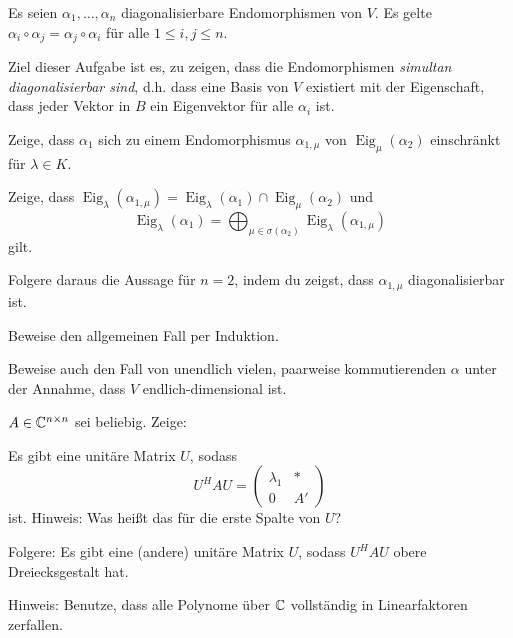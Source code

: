 \begin{sheet}

\begin{problem}[title={Simultane Diagonalisierbarkeit}]\label{ex:simultan_diagonalisieren}
Es seien $\alpha_1,\ldots,\alpha_n$ diagonalisierbare Endomorphismen von $V$. Es gelte $\alpha_i\circ\alpha_j = \alpha_j\circ\alpha_i$ für alle $1\leq i,j\leq n$.

Ziel dieser Aufgabe ist es, zu zeigen, dass die Endomorphismen \emph{simultan diagonalisierbar sind}, d.h. dass eine Basis von $V$ existiert mit der Eigenschaft, dass jeder Vektor in $B$ ein Eigenvektor für alle $\alpha_i$ ist.

\begin{subproblem}
Zeige, dass $\alpha_1$ sich zu einem Endomorphismus $\alpha_{1,\mu}$ von $\operatorname{Eig}_\mu(\alpha_2)$ einschränkt für $\lambda\in K$.
\end{subproblem}
\begin{subproblem}
Zeige, dass $\operatorname{Eig}_\lambda(\alpha_{1,\mu}) = \operatorname{Eig}_\lambda(\alpha_1) \cap \operatorname{Eig}_\mu(\alpha_2)$ und
\[\operatorname{Eig}_\lambda(\alpha_1) = \bigoplus_{\mu\in\sigma(\alpha_2)} \operatorname{Eig}_\lambda(\alpha_{1,\mu})\]
gilt.
\end{subproblem}
\begin{subproblem}
Folgere daraus die Aussage für $n=2$, indem du zeigst, dass $\alpha_{1,\mu}$ diagonalisierbar ist.
\end{subproblem}
\begin{subproblem}
Beweise den allgemeinen Fall per Induktion. 
\end{subproblem}
\begin{subproblem}
Beweise auch den Fall von unendlich vielen, paarweise kommutierenden $\alpha$ unter der Annahme, dass $V$ endlich-dimensional ist.
\end{subproblem}
\end{problem}

\begin{problem}[title={Hermite Normalform}]
$A\in\mathbb{C}^{n\times n}$ sei beliebig. Zeige:
\begin{subproblem}
Es gibt eine unitäre Matrix $U$, sodass 
\[U^H A U = \begin{pmatrix}
\lambda_1&\ast\\0&A'
\end{pmatrix}\]
ist. Hinweis: Was heißt das für die erste Spalte von $U$?
\end{subproblem}
\begin{subproblem}
Folgere: Es gibt eine (andere) unitäre Matrix $U$, sodass $U^H A U$ obere Dreiecksgestalt hat.
\end{subproblem}
Hinweis: Benutze, dass alle Polynome über $\mathbb{C}$ vollständig in Linearfaktoren zerfallen.
\end{problem}


\end{sheet}
